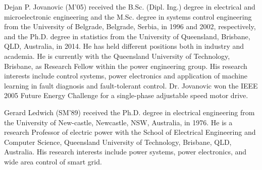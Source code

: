 \documentclass[journal,a4paper,10pt,twoside]{IEEEtran} %
\begin{document}
	\vspace{-1cm}
	\begin{IEEEbiography}
	{Dejan P. Jovanovic }
	(M'05) received the B.Sc. (Dipl. Ing.) degree in electrical and microelectronic engineering and the M.Sc. degree in systems control engineering from the University of Belgrade, Belgrade, Serbia, in 1996 and 2002, respectively, and the Ph.D. degree in statistics from the University of Queensland, Brisbane, QLD, Australia, in 2014. He has held different positions both in industry and academia. He is currently with the Queensland University of Technology, Brisbane, as Research Fellow within the power engineering group. His research interests include control systems, power electronics and application of machine learning in fault diagnosis and fault-tolerant control. Dr. Jovanovic won the IEEE 2005 Future Energy Challenge for a single-phase adjustable speed motor drive.
	\end{IEEEbiography}
	
	
	\begin{IEEEbiography}
	{Gerard Ledwich}
	(SM’89) received the Ph.D. degree in electrical engineering from the University of New-castle, Newcastle, NSW, Australia, in 1976. He is a research Professor of electric power with the School of Electrical Engineering and Computer Science, Queensland University of Technology, Brisbane, QLD, Australia. His research interests include power systems, power electronics, and wide area control of smart grid.
	\end{IEEEbiography}
	\vspace{5cm}
	
\end{document}
